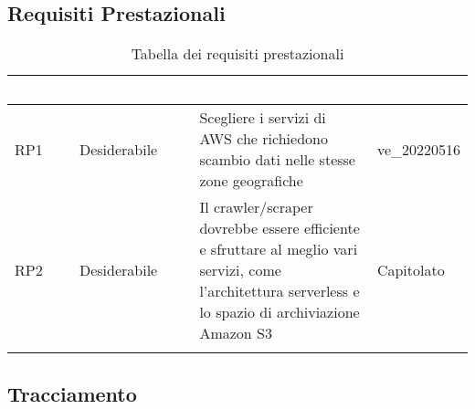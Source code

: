 \subsection{Requisiti Prestazionali}
{
      \setlength{\freewidth}{\dimexpr\textwidth-10\tabcolsep}
      \renewcommand{\arraystretch}{1.5}
      \centering
      \setlength{\aboverulesep}{0pt}
      \setlength{\belowrulesep}{0pt}
      \begin{longtable}{C{.257\freewidth} C{.257\freewidth} C{.257\freewidth} C{.257\freewidth}}
         \toprule
      \textcolor{white}{\textbf{Codice}}&
      \textcolor{white}{\textbf{Classificazione}}&
      \textcolor{white}{\textbf{Descrizione}}&
      \textcolor{white}{\textbf{Fonti}}\\	
      \toprule
      \endhead
      
      RP1 & Desiderabile & Scegliere i servizi di AWS che richiedono scambio dati nelle stesse zone geografiche & ve\_20220516 \\
      RP2 & Desiderabile & Il crawler/scraper dovrebbe essere efficiente e sfruttare al meglio vari servizi, come l'architettura serverless e lo spazio di archiviazione Amazon S3 & Capitolato \\	   
      \bottomrule
      \caption{Tabella dei requisiti prestazionali}
      \end{longtable}
}
\subsection{Tracciamento}
